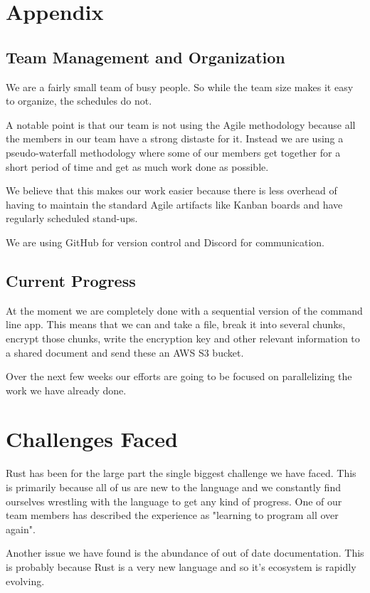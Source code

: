 \documentclass[conference]{IEEEtran}
\begin{document}
\section{Appendix}
\subsection{Team Management and Organization}
We are a fairly small team of busy people.
So while the team size makes it easy to organize, the schedules do not.

A notable point is that our team is not using the Agile methodology because
all the members in our team have a strong distaste for it.
Instead we are using a pseudo-waterfall methodology where some of our members get together
for a short period of time and get as much work done as possible.

We believe that this makes our work easier because there is less overhead of having
to maintain the standard Agile artifacts like Kanban boards and have regularly scheduled stand-ups.

We are using GitHub for version control and Discord for communication.

\subsection{Current Progress}

At the moment we are completely done with a sequential version of the command line app.
This means that we can and take a file, break it into several chunks, encrypt those chunks,
write the encryption key and other relevant information to a shared document and send these
an AWS S3 bucket.

Over the next few weeks our efforts are going to be focused on parallelizing the work we have
already done.

\section{Challenges Faced}

Rust has been for the large part the single biggest challenge we have faced.
This is primarily because all of us are new to the language and we constantly find ourselves
wrestling with the language to get any kind of progress.
One of our team members has described the experience as "learning to program all over again".

Another issue we have found is the abundance of out of date documentation.
This is probably because Rust is a very new language and so it's ecosystem is rapidly evolving.
\end{document}
